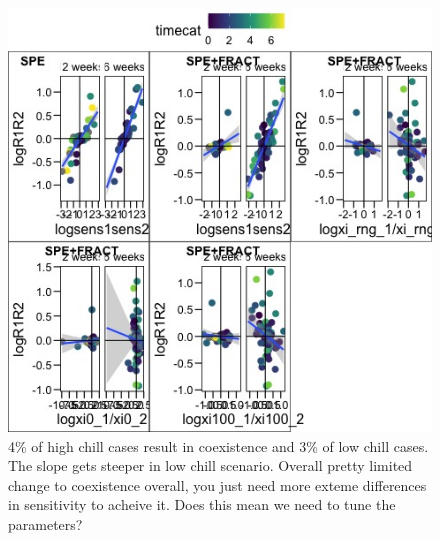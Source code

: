 \documentclass{article}
\begin{document}
\begin{figure}[h!]
  \centering
 \includegraphics[width=\textwidth]{..//plots/coexistance_runner.jpeg}
    \caption{4\% of high chill cases result in coexistence and 3\% of low chill cases. The slope gets steeper in low chill scenario. Overall pretty limited change to coexistence overall, you just need more exteme differences in sensitivity to acheive it. Does this mean we need to tune the parameters?}
    \label{Fig:coexistence}
\end{figure}
\end{document}

